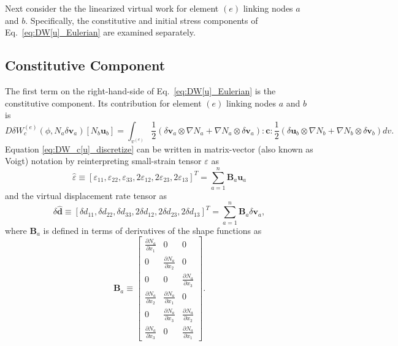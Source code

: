 Next consider the the linearized virtual work for element $(e)$ linking nodes $a$ and $b$. Specifically, the constitutive and initial stress components of Eq.\ \eqref{eq:DW[u]_Eulerian} are examined separately.

\subsection{Constitutive Component}

The first term on the right-hand-side of Eq.\ \eqref{eq:DW[u]_Eulerian} is the constitutive component. Its contribution for element $(e)$ linking nodes $a$ and $b$ is
%
\begin{equation}
D\delta W_c^{(e)}(\phi,N_a\delta \pmb{v}_a)[N_b\pmb{u}_b] = \int_{v^{(e)}} \frac{1}{2} \left(\delta \pmb{v}_a \otimes \nabla N_a + \nabla N_a \otimes \delta \pmb{v}_a\right):\pmb{c}:\frac{1}{2} \left(\delta \pmb{u}_b \otimes \nabla N_b + \nabla N_b \otimes \delta \pmb{v}_b\right)dv.
\label{eq:DW_c[u]_discretize}
\end{equation}
%
Equation \eqref{eq:DW_c[u]_discretize} can be written in matrix-vector (also known as Voigt) notation by reinterpreting small-strain tensor $\varepsilon$ as
%
\begin{equation}
\hat{\varepsilon} \equiv [\varepsilon_{11}, \varepsilon_{22}, \varepsilon_{33}, 2\varepsilon_{12}, 2\varepsilon_{23}, 2\varepsilon_{13}]^T = \sum_{a=1}^n \pmb{B}_a \pmb{u}_a
\label{eq:strain_Voigt}
\end{equation}
%
and the virtual displacement rate tensor as
%
\begin{equation}
\delta\hat{\pmb{d}} \equiv [\delta d_{11}, \delta d_{22}, \delta d_{33}, 2\delta d_{12}, 2\delta d_{23}, 2\delta d_{13}]^T = \sum_{a=1}^n \pmb{B}_a \delta \pmb{v}_a,
\label{eq:virtual_displacement_Voigt}
\end{equation}
%
where $\pmb{B}_a$ is defined in terms of derivatives of the shape functions as
%
\begin{equation}
\pmb{B}_a \equiv
\begin{bmatrix}
\frac{\partial N_a}{\partial x_1} & 0 & 0  \\
0 & \frac{\partial N_a}{\partial x_2} & 0 \\
0 & 0 & \frac{\partial N_a}{\partial x_3} \\
\frac{\partial N_a}{\partial x_2} & \frac{\partial N_a}{\partial x_1} & 0  \\ 
0 & \frac{\partial N_a}{\partial x_3} & \frac{\partial N_a}{\partial x_2}  \\
\frac{\partial N_a}{\partial x_3} & 0 & \frac{\partial N_a}{\partial x_1} 
\end{bmatrix}.
\end{equation}
